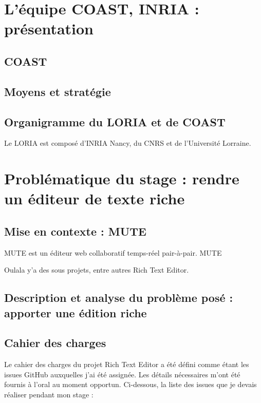 \documentclass[12pt]{article}
\begin{document}
\newpage
\section{L'équipe COAST, INRIA : présentation}
\subsection{COAST}

\subsection{Moyens et stratégie}

\subsection{Organigramme du LORIA et de COAST}
Le LORIA est composé d'INRIA Nancy, du CNRS et de l'Université Lorraine.

\newpage
\section{Problématique du stage : rendre un éditeur de texte riche}
\subsection{Mise en contexte : MUTE}
MUTE est un éditeur web collaboratif temps-réel pair-à-pair. MUTE 

Oulala y'a des sous projets, entre autres Rich Text Editor.

\subsection{Description et analyse du problème posé : apporter une édition riche}


\subsection{Cahier des charges}
Le cahier des charges du projet Rich Text Editor a été défini comme étant les issues GitHub auxquelles j'ai été assignée. Les détails nécessaires m'ont été fournis à l'oral au moment opportun. Ci-dessous, la liste des issues que je devais réaliser pendant mon stage :\\
\end{document}
